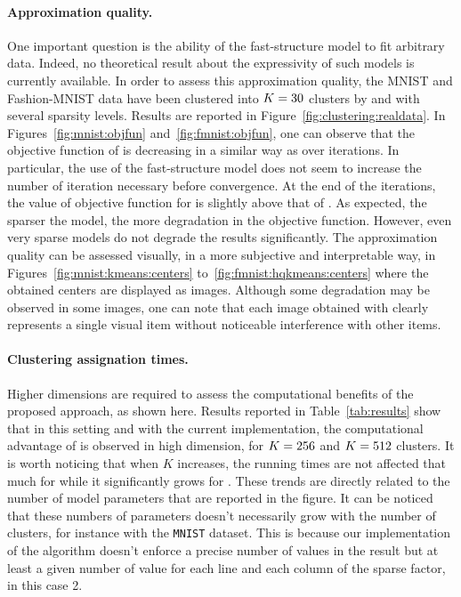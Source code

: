 \paragraph{Approximation quality.} One important question is the ability of the fast-structure model to fit arbitrary data.
Indeed, no theoretical result about the expressivity of such models is currently available.
In order to assess this approximation quality, the MNIST and Fashion-MNIST data have been clustered into $K=30$ clusters by \kmeans and \qkmeans with several sparsity levels.
Results are reported in Figure~\ref{fig:clustering:realdata}.
In Figures~\ref{fig:mnist:objfun} and~\ref{fig:fmnist:objfun}, one can observe that the objective function of \qkmeans is decreasing in a similar way as \kmeans over iterations.
In particular, the use of the fast-structure model does not seem to increase the number of iteration necessary before convergence.
At the end of the iterations, the value of objective function for \qkmeans is slightly above that of \kmeans.
As expected, the sparser the model, the more degradation in the objective function.
However, even very sparse models do not degrade the results significantly. %
The approximation quality can be assessed visually, in a more subjective and interpretable way, in Figures~\ref{fig:mnist:kmeans:centers} to~\ref{fig:fmnist:hqkmeans:centers} where the obtained centers are displayed as images.
Although some degradation may be observed in some images, one can note that each image obtained with \qkmeans clearly represents a single visual item without noticeable interference with other items.

\paragraph{Clustering assignation times.}
Higher dimensions are required to assess the computational benefits of the proposed approach, as shown here.
Results reported in Table~\ref{tab:results} show that in this setting and with the current implementation, the computational advantage of \qkmeans is observed in high dimension, for $K=256$ and $K=512$ clusters. It is worth noticing that when $K$ increases, the running times are not affected that much for \qkmeans while it significantly grows for \kmeans. These trends are directly related to the number of model parameters that are reported in the figure. It can be noticed that these numbers of parameters doesn't necessarily grow with the number of clusters, for instance with the \texttt{MNIST} dataset. This is because our implementation of the \palm algorithm doesn't enforce a precise number of values in the result but at least a given number of value for each line and each column of the sparse factor, in this case 2.


